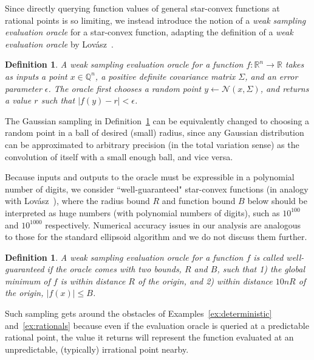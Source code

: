 \documentclass[11pt,letter]{article}
\newcommand{\from}{\leftarrow}
\newcommand{\Normal}{\mathcal{N}}
\newcommand{\Real}{\mathbb{R}}
\newcommand{\Rational}{\mathbb{Q}}
\newcommand{\ferr}{\epsilon}
\newcounter{nTheorems}
\numberwithin{nTheorems}{section}
\newtheorem{definition}[nTheorems]{Definition}
\begin{document}
Since directly querying function values of general star-convex functions at rational points is so limiting, we instead introduce the notion of a \emph{weak sampling evaluation oracle} for a star-convex function, adapting the definition of a \emph{weak evaluation oracle} by Lov\'{a}sz~\cite{Lovasz:1987}.

\begin{definition}
\label{def:evaluation}
A \emph{weak sampling evaluation oracle} for a function $f:\Real^n \to \Real$ takes as inputs a point $x \in \Rational^n$, a positive definite covariance matrix $\Sigma$, and an error parameter $\ferr$. The oracle first chooses a random point $y \from \Normal(x,\Sigma)$, and returns a value $r$ such that $|f(y)-r|<\ferr$.
\end{definition}

The Gaussian sampling in Definition~\ref{def:evaluation} can be equivalently changed to choosing a random point in a ball of desired (small) radius, since any Gaussian distribution can be approximated to arbitrary precision (in the total variation sense) as the convolution of itself with a small enough ball, and vice versa. 

Because inputs and outputs to the oracle must be expressible in a polynomial number of digits, we consider ``well-guaranteed" star-convex functions (in analogy with Lov\'{a}sz~\cite{Lovasz:1987}), where the radius bound $R$ and function bound $B$ below should be interpreted as huge numbers (with polynomial numbers of digits), such as $10^{100}$ and $10^{1000}$ respectively. Numerical accuracy issues in our analysis are analogous to those for the standard ellipsoid algorithm and we do not discuss them further.

\begin{definition}\label{def:boundedness}
  A weak sampling evaluation oracle for a function $f$ is called \emph{well-guaranteed} if the oracle comes with two bounds, $R$ and $B$, such that 1) the global minimum of $f$ is within distance $R$ of the origin, and 2) within distance $10nR$ of the origin, $|f(x)|\le B$.
\end{definition}

Such sampling gets around the obstacles of Examples~\ref{ex:deterministic} and~\ref{ex:rationals} because even if the evaluation oracle is queried at a predictable rational point, the value it returns will represent the function evaluated at an unpredictable, (typically) irrational point nearby.
\end{document}
